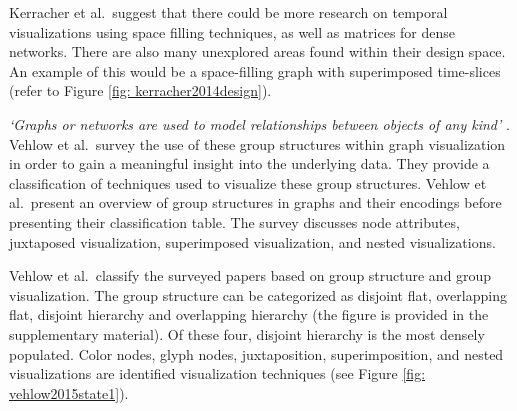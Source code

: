 %
Kerracher et al.\ suggest that there could be more research on temporal visualizations using space filling techniques, as well as matrices for dense networks. There are also many unexplored areas found within their design space. An example of this would be a space-filling graph with superimposed time-slices (refer to Figure \ref{fig: kerracher2014design}).

\textit{`Graphs or networks are used to model relationships between
objects of any kind'} \cite{vehlow2015state}. Vehlow et al.\ survey the use of these group structures within graph visualization in order to gain a meaningful insight into the underlying data. They provide a classification of techniques used to visualize these group structures.
Vehlow et al.\ present an overview of group structures in graphs and their encodings before presenting their classification table. The survey discusses node attributes, juxtaposed visualization, superimposed visualization, and nested visualizations.

Vehlow et al.\ classify the surveyed papers based on group structure and group visualization. The group structure can be categorized as disjoint flat, overlapping flat, disjoint hierarchy and overlapping hierarchy (the figure is provided in the supplementary material). Of these four, disjoint hierarchy is the most densely populated. Color nodes, glyph nodes, juxtaposition, superimposition, and nested visualizations are identified visualization techniques (see Figure \ref{fig: vehlow2015state1}).

